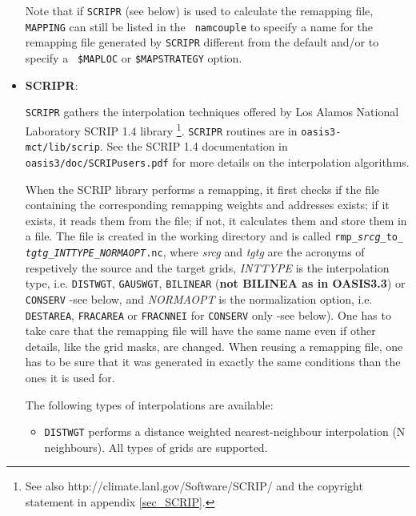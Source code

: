 \begin{itemize}
\begin{itemize}
  \end{itemize}

  Note that if {\tt SCRIPR} (see below) is used to calculate the
  remapping file, {\tt MAPPING} can still be listed in the {\tt
    namcouple} to specify a name for the remapping file generated by
  {\tt SCRIPR} different from the default and/or to specify a {\tt
    \$MAPLOC} or {\tt \$MAPSTRATEGY} option.

\item {\bf SCRIPR}:
 
  {\tt SCRIPR} gathers the interpolation techniques offered by Los
  Alamos National Laboratory SCRIP 1.4 library
  \citep{Jones99}\footnote{See also
    http://climate.lanl.gov/Software/SCRIP/ and the copyright
    statement in appendix \ref{sec_SCRIP}.}.  {\tt SCRIPR} routines
  are in {\tt oasis3-mct/lib/scrip}. See the SCRIP 1.4 documentation
  in {\tt oasis3/doc/SCRIPusers.pdf} for more details on the
  interpolation algorithms.

  When the SCRIP library performs a remapping, it first checks if the
  file containing the corresponding remapping weights and addresses
  exists; if it exists, it reads them from the file; if not, it
  calculates them and store them in a file. The file is created in the
  working directory and is called {\tt rmp\_{\it srcg}\_to\_{\it
      tgtg}\_{\it INTTYPE}\_{\it NORMAOPT}.nc}, where {\it srcg} and
  {\it tgtg} are the acronyms of respetively the source and the target
  grids, {\it INTTYPE} is the interpolation type, i.e. {\tt DISTWGT},
  {\tt GAUSWGT}, {\tt BILINEAR} ({\bf not BILINEA as in OASIS3.3}) or
  {\tt CONSERV} -see below, and {\it NORMAOPT} is the normalization
  option, i.e. {\tt DESTAREA}, {\tt FRACAREA} or {\tt FRACNNEI} for
  {\tt CONSERV} only -see below). One has to take care that the
  remapping file will have the same name even if other details, like
  the grid masks, are changed. When reusing a remapping file, one has
  to be sure that it was generated in exactly the same conditions than
  the ones it is used for.

  The following types of interpolations are available:

  \begin{itemize}

  \item {\tt DISTWGT} performs a distance weighted nearest-neighbour
    interpolation (N neighbours). All types of grids are supported.

    \begin{itemize}


\end{itemize}
\end{itemize}
\end{itemize}
